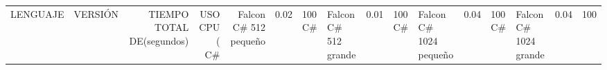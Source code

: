 \begin{tabular}{llrrr}
\toprule
LENGUAJE &                VERSIÓN & TIEMPO TOTAL DE (segundos) & USO CPU (%
\midrule
      C# &  Falcon C# 512 pequeño &                                  0.02 &        100%
      C# &   Falcon C# 512 grande &                                  0.01 &        100%
      C# & Falcon C# 1024 pequeño &                                  0.04 &        100%
      C# &  Falcon C# 1024 grande &                                  0.04 &        100%
\bottomrule
\end{tabular}
